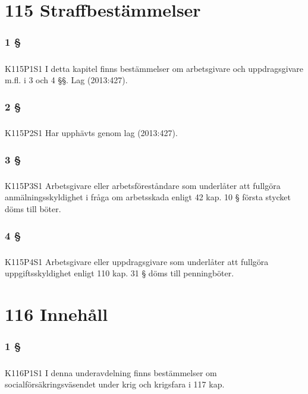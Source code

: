 \documentclass[a4paper,notitlepage,openany,10pt]{book}
\begin{document}
\chapter*{115 Straffbestämmelser}
\subsection*{1 §}
\paragraph*{}
{\tiny K115P1S1}
I detta kapitel finns bestämmelser om arbetsgivare och uppdragsgivare m.fl. i 3 och 4 §§.
Lag (2013:427).
\subsection*{2 §}
\paragraph*{}
{\tiny K115P2S1}
Har upphävts genom
lag (2013:427).
\subsection*{3 §}
\paragraph*{}
{\tiny K115P3S1}
Arbetsgivare eller arbetsföreståndare som underlåter att fullgöra anmälningsskyldighet i fråga om arbetsskada enligt 42 kap. 10 § första stycket döms till böter.
\subsection*{4 §}
\paragraph*{}
{\tiny K115P4S1}
Arbetsgivare eller uppdragsgivare som underlåter att fullgöra uppgiftsskyldighet enligt 110 kap. 31 § döms till penningböter.
\chapter*{116 Innehåll}
\subsection*{1 §}
\paragraph*{}
{\tiny K116P1S1}
I denna underavdelning finns bestämmelser om socialförsäkringsväsendet under krig och krigsfara i 117 kap.
\end{document}

